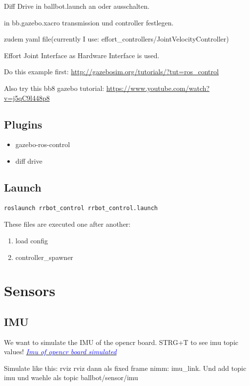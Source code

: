 \documentclass[twoside,colorback,accentcolor=tud4c,11pt]{tudreport}
\newcommand{\mylink}[2] {	\href{#1}{	\textit{\textcolor{blue}{#2}}}}
\begin{document}
	Diff Drive in ballbot.launch an oder ausschalten. 
	
	in bb.gazebo.xacro transmission und controller festlegen.
	
	zudem yaml file(currently I use: effort\_controllers/JointVelocityController)
	
	Effort Joint Interface as Hardware Interface is used.
	
	Do this example first: \url{http://gazebosim.org/tutorials/?tut=ros_control}
	
	Also try this bb8 gazebo tutorial: \url{https://www.youtube.com/watch?v=j5qC9l448p8}
	
	\subsection{Plugins}
	\begin{itemize}
		\item gazebo-ros-control
		\item diff drive
	\end{itemize}
	
	\subsection{Launch}
	\begin{lstlisting}[style=BashInputStyle]
	roslaunch rrbot_control rrbot_control.launch
	\end{lstlisting}
	
	These files are executed one after another:
	\begin{enumerate}
		\item load config
		\item controller\_spawner
	\end{enumerate}
	
	\section{Sensors}
	\subsection{IMU}
	
		We want to simulate the IMU of the opencr board. STRG+T to see imu topic values!
	\mylink{https://www.youtube.com/watch?v=wXN_7oRHst0}{Imu of opencr board simulated}

	Simulate like this:
	rviz rviz dann als fixed frame nimm: imu\_link. Und add topic imu und waehle als topic ballbot/sensor/imu
	
\end{document}
